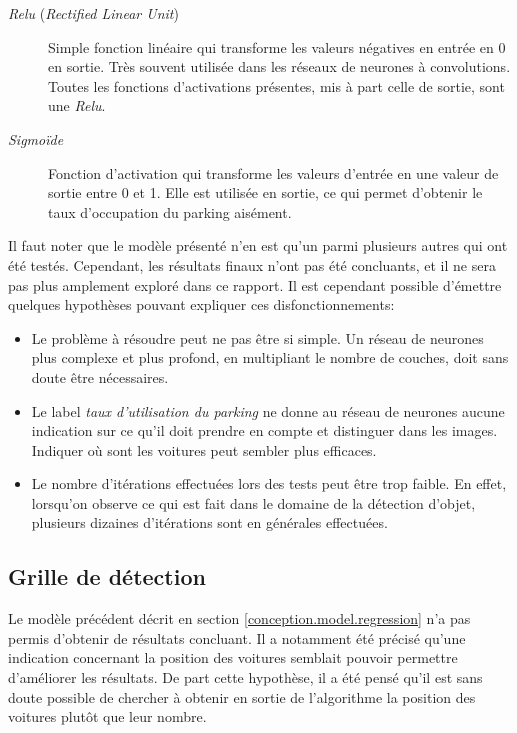 \begin{description}
    \item[\textit{Relu} (\textit{Rectified Linear Unit})] Simple fonction linéaire qui transforme les valeurs négatives en entrée en $0$ en sortie. Très souvent utilisée dans les réseaux de neurones à convolutions. Toutes les fonctions d'activations présentes, mis à part celle de sortie, sont une \textit{Relu}.
    \item[\textit{Sigmoïde}] Fonction d'activation qui transforme les valeurs d'entrée en une valeur de sortie entre 0 et 1. Elle est utilisée en sortie, ce qui permet d'obtenir le taux d'occupation du parking aisément.
\end{description}

Il faut noter que le modèle présenté n'en est qu'un parmi plusieurs autres qui ont été testés. Cependant, les résultats finaux n'ont pas été concluants, et il ne sera pas plus amplement exploré dans ce rapport. Il est cependant possible d'émettre quelques hypothèses pouvant expliquer ces disfonctionnements:

\begin{itemize}
    \item Le problème à résoudre peut ne pas être si simple. Un réseau de neurones plus complexe et plus profond, en multipliant le nombre de couches, doit sans doute être nécessaires. 
    \item Le label \textit{taux d'utilisation du parking} ne donne au réseau de neurones aucune indication sur ce qu'il doit prendre en compte et distinguer dans les images. Indiquer où sont les voitures peut sembler plus efficaces.
    \item Le nombre d'itérations effectuées lors des tests peut être trop faible. En effet, lorsqu'on observe ce qui est fait dans le domaine de la détection d'objet, plusieurs dizaines d'itérations sont en générales effectuées. 
\end{itemize}

\subsection{Grille de détection} 
Le modèle précédent décrit en section \ref{conception.model.regression} n'a pas permis d'obtenir de résultats concluant. Il a notamment été précisé qu'une indication concernant la position des voitures semblait pouvoir permettre d'améliorer les résultats. De part cette hypothèse, il a été pensé qu'il est sans doute possible de chercher à obtenir en sortie de l'algorithme la position des voitures plutôt que leur nombre.

